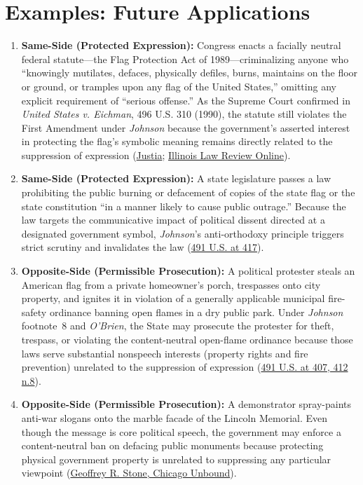 \documentclass[12pt]{article}
\begin{document}
\section{Examples: Future Applications}
\begin{enumerate}
    \item \textbf{Same-Side (Protected Expression):} Congress enacts a facially neutral federal statute---the Flag Protection Act of 1989---criminalizing anyone who ``knowingly mutilates, defaces, physically defiles, burns, maintains on the floor or ground, or tramples upon any flag of the United States,'' omitting any explicit requirement of ``serious offense.'' As the Supreme Court confirmed in \textit{United States v. Eichman}, 496 U.S. 310 (1990), the statute still violates the First Amendment under \textit{Johnson} because the government's asserted interest in protecting the flag's symbolic meaning remains directly related to the suppression of expression (\href{https://supreme.justia.com/cases/federal/us/491/397/}{Justia}; \href{https://illinoislawreview.org/wp-content/uploads/2022/10/Flanders.pdf}{Illinois Law Review Online}).

    \item \textbf{Same-Side (Protected Expression):} A state legislature passes a law prohibiting the public burning or defacement of copies of the state flag or the state constitution ``in a manner likely to cause public outrage.'' Because the law targets the communicative impact of political dissent directed at a designated government symbol, \textit{Johnson}'s anti-orthodoxy principle triggers strict scrutiny and invalidates the law (\href{https://supreme.justia.com/cases/federal/us/491/397/}{491 U.S. at 417}).

    \item \textbf{Opposite-Side (Permissible Prosecution):} A political protester steals an American flag from a private homeowner's porch, trespasses onto city property, and ignites it in violation of a generally applicable municipal fire-safety ordinance banning open flames in a dry public park. Under \textit{Johnson} footnote~8 and \textit{O'Brien}, the State may prosecute the protester for theft, trespass, or violating the content-neutral open-flame ordinance because those laws serve substantial nonspeech interests (property rights and fire prevention) unrelated to the suppression of expression (\href{https://supreme.justia.com/cases/federal/us/491/397/}{491 U.S. at 407, 412 n.8}).

    \item \textbf{Opposite-Side (Permissible Prosecution):} A demonstrator spray-paints anti-war slogans onto the marble facade of the Lincoln Memorial. Even though the message is core political speech, the government may enforce a content-neutral ban on defacing public monuments because protecting physical government property is unrelated to suppressing any particular viewpoint (\href{https://chicagounbound.uchicago.edu/cgi/viewcontent.cgi?article=1010&context=occasional_papers}{Geoffrey R. Stone, Chicago Unbound}).


\end{enumerate}
\end{document}
